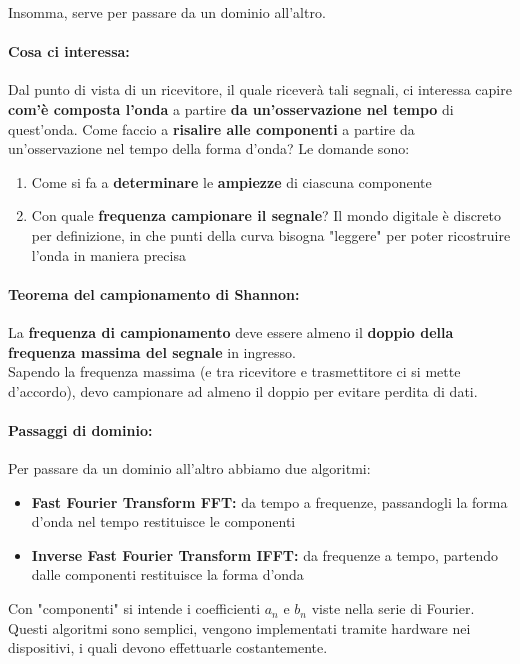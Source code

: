 \newpage

Insomma, serve per passare da un dominio all'altro.

\paragraph{Cosa ci interessa:} Dal punto di vista di un ricevitore, il quale riceverà tali segnali, ci interessa capire \textbf{com'è composta l'onda} a partire \textbf{da un'osservazione nel tempo} di quest'onda. Come faccio a \textbf{risalire alle componenti} a partire da un'osservazione nel tempo della forma d'onda? Le domande sono: 
\begin{enumerate}
	\item Come si fa a \textbf{determinare} le \textbf{ampiezze} di ciascuna componente
	\item Con quale \textbf{frequenza campionare il segnale}? Il mondo digitale è discreto per definizione, in che punti della curva bisogna "leggere" per poter ricostruire l'onda in maniera precisa
\end{enumerate}

\paragraph{Teorema del campionamento di Shannon:} La \textbf{frequenza di campionamento} deve essere almeno il \textbf{doppio della frequenza massima del segnale} in ingresso. \\
Sapendo la frequenza massima (e tra ricevitore e trasmettitore ci si mette d'accordo), devo campionare ad almeno il doppio per evitare perdita di dati. \\

\paragraph{Passaggi di dominio:} Per passare da un dominio all'altro abbiamo due algoritmi:
\begin{itemize}
	\item \textbf{Fast Fourier Transform FFT:} da tempo a frequenze, passandogli la forma d'onda nel tempo restituisce le componenti
	\item \textbf{Inverse Fast Fourier Transform IFFT:} da frequenze a tempo, partendo dalle componenti restituisce la forma d'onda
\end{itemize}

Con "componenti" si intende i coefficienti $a_n$ e $b_n$ viste nella serie di Fourier. Questi algoritmi sono semplici, vengono implementati tramite hardware nei dispositivi, i quali devono effettuarle costantemente. \\


